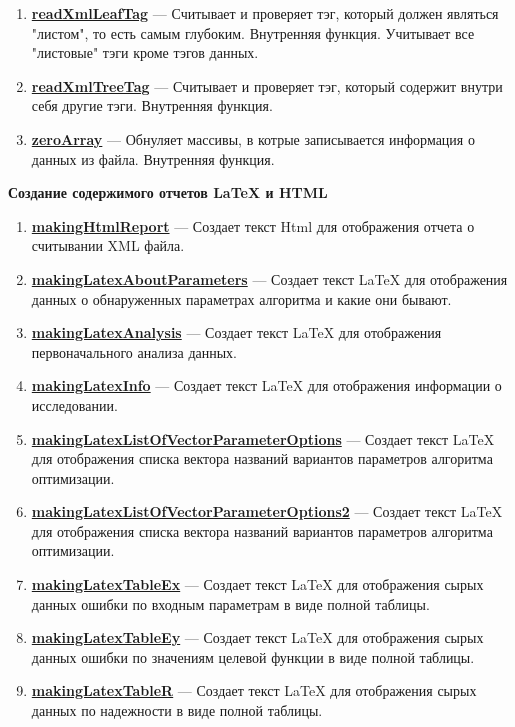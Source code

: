 \documentclass[a4paper,12pt]{article}
\begin{document}
\begin{enumerate}
\item \textbf{\hyperref[readXmlLeafTag]{readXmlLeafTag}} --- Считывает и проверяет тэг, который должен являться "листом", то есть самым глубоким. Внутренняя функция. Учитывает все "листовые" тэги кроме тэгов данных.

\item \textbf{\hyperref[readXmlTreeTag]{readXmlTreeTag}} --- Считывает и проверяет тэг, который содержит внутри себя другие тэги. Внутренняя функция.

\item \textbf{\hyperref[zeroArray]{zeroArray}} --- Обнуляет массивы, в котрые записывается информация о данных из файла. Внутренняя функция.

\end{enumerate}

\textbf{Создание содержимого отчетов LaTeX и HTML}
\begin{enumerate}

\item \textbf{\hyperref[makingHtmlReport]{makingHtmlReport}} --- Создает текст Html для отображения отчета о считывании XML файла.

\item \textbf{\hyperref[makingLatexAboutParameters]{makingLatexAboutParameters}} --- Создает текст LaTeX для отображения данных о обнаруженных параметрах алгоритма и какие они бывают.

\item \textbf{\hyperref[makingLatexAnalysis]{makingLatexAnalysis}} --- Создает текст LaTeX для отображения первоначального анализа данных.

\item \textbf{\hyperref[makingLatexInfo]{makingLatexInfo}} --- Создает текст LaTeX для отображения информации о исследовании.

\item \textbf{\hyperref[makingLatexListOfVectorParameterOptions]{makingLatexListOfVectorParameterOptions}} --- Создает текст LaTeX для отображения списка вектора названий вариантов параметров алгоритма оптимизации.

\item \textbf{\hyperref[makingLatexListOfVectorParameterOptions2]{makingLatexListOfVectorParameterOptions2}} --- Создает текст LaTeX для отображения списка вектора названий вариантов параметров алгоритма оптимизации.

\item \textbf{\hyperref[makingLatexTableEx]{makingLatexTableEx}} --- Создает текст LaTeX для отображения сырых данных ошибки по входным параметрам в виде полной таблицы.

\item \textbf{\hyperref[makingLatexTableEy]{makingLatexTableEy}} --- Создает текст LaTeX для отображения сырых данных ошибки по значениям целевой функции в виде полной таблицы.

\item \textbf{\hyperref[makingLatexTableR]{makingLatexTableR}} --- Создает текст LaTeX для отображения сырых данных по надежности в виде полной таблицы.

\end{enumerate}
\end{document}
